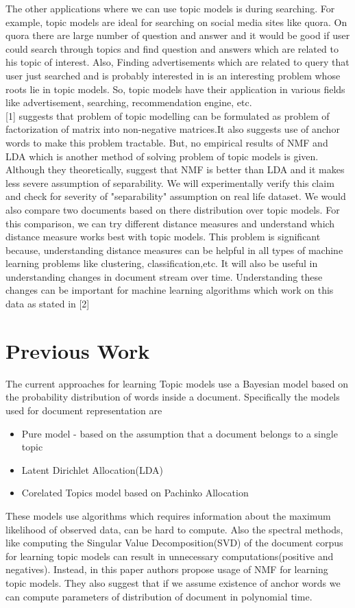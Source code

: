 \documentclass[a4paper,11pt]{article}
\begin{document}
The other applications where we can use topic models is during searching. For example, topic models are ideal for searching on social media sites like quora. On quora there are large number of question and answer and it would be good if user could search through topics and find question and answers which are related to his topic of interest. Also, Finding advertisements which are related to query that user just searched and is probably interested in is an interesting problem whose roots lie in topic models. So, topic models have their application in various fields like advertisement, searching, recommendation engine, etc. \\

[1] suggests that problem of topic modelling can be formulated as problem of factorization of matrix into non-negative matrices.It also suggests use of anchor words to make this problem tractable. But, no empirical results of NMF and LDA which is another method of solving problem of topic models is given. Although they theoretically, suggest that NMF is better than LDA and it makes less severe assumption of separability. We will experimentally verify this claim and check for severity of "separability" assumption on real life dataset. We would also compare two documents based on there distribution over topic models. For this comparison, we can try different distance measures and understand which distance measure works best with topic models. This problem is significant because, understanding distance measures can be helpful in all types of machine learning problems like clustering, classification,etc. It will also be useful in understanding changes in document stream over time. Understanding these changes can be important for machine learning algorithms which work on this data as stated in [2]

\section{Previous Work}

The current approaches for learning Topic models use a Bayesian model based on the probability distribution of words inside a document{\cite{blei}}. Specifically the models used for document representation are

\begin{itemize} 
\item Pure model - based on the assumption that a document belongs to a single topic
\item Latent Dirichlet Allocation(LDA)
\item Corelated Topics model based on Pachinko Allocation
\end{itemize}
These models use algorithms which requires information about the maximum likelihood of observed data, can be hard to compute. Also the spectral methods, like computing the Singular Value Decomposition(SVD) of the document corpus for learning topic models can result in unnecessary computations(positive and negatives). Instead, in this paper authors propose usage of NMF for learning topic models. They also suggest that if we assume existence of anchor words we can compute parameters of distribution of document in polynomial time. 
\end{document}

